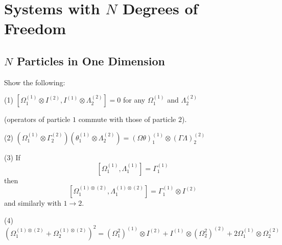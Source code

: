 \documentclass[../principles-of-quantum-mechanics.tex]{subfiles}
\begin{document}
	\printanswers
	
	\section{Systems with $N$ Degrees of Freedom}
	
	\begin{questions}
		\setcounter{subsection}{0}
		\setcounter{question}{0}
		\subsection{$N$ Particles in One Dimension}
		
		\question Show the following:
		
		(1) $[\Omega_1^{(1)}\otimes I^{(2)}, I^{(1)}\otimes\Lambda_2^{(2)}] = 0$ for any $\Omega_1^{(1)}$ and $\Lambda_2^{(2)}$

		(operators of particle $1$ commute with those of particle $2$).
		
		(2) $(\Omega_1^{(1)}\otimes \Gamma_2^{(2)})(\theta_1^{(1)}\otimes\Lambda_2^{(2)}) = (\Omega\theta)_1^{(1)}\otimes(\Gamma\Lambda)_2^{(2)}$
		
		(3) If
		$$[\Omega_1^{(1)}, \Lambda_1^{(1)}] = \Gamma_1^{(1)}$$
		then
		$$[\Omega_1^{(1)\otimes(2)}, \Lambda_1^{(1)\otimes(2)}] = \Gamma_1^{(1)}\otimes I^{(2)}$$
		and similarly with $1 \to 2$.
		
		(4) $(\Omega_1^{(1)\otimes(2)} + \Omega_2^{(1)\otimes(2)})^2 = (\Omega_1^2)^{(1)}\otimes I^{(2)} + I^{(1)}\otimes (\Omega_2^2)^{(2)} + 2\Omega_1^{(1)}\otimes \Omega_2^{(2)}$
		

\end{questions}
\end{document}
